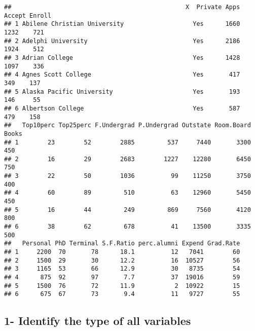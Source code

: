 \documentclass[]{article}
\newenvironment{Shaded}{\begin{snugshade}}{\end{snugshade}}
\newcommand{\DataTypeTok}[1]{\textcolor[rgb]{0.13,0.29,0.53}{#1}}
\newcommand{\KeywordTok}[1]{\textcolor[rgb]{0.13,0.29,0.53}{\textbf{#1}}}
\newcommand{\NormalTok}[1]{#1}
\newcommand{\OperatorTok}[1]{\textcolor[rgb]{0.81,0.36,0.00}{\textbf{#1}}}
\newcommand{\StringTok}[1]{\textcolor[rgb]{0.31,0.60,0.02}{#1}}
\begin{document}
\begin{verbatim}
##                                                X  Private Apps Accept Enroll
## 1 Abilene Christian University                   Yes      1660   1232    721
## 2 Adelphi University                             Yes      2186   1924    512
## 3 Adrian College                                 Yes      1428   1097    336
## 4 Agnes Scott College                            Yes       417    349    137
## 5 Alaska Pacific University                      Yes       193    146     55
## 6 Albertson College                              Yes       587    479    158
##   Top10perc Top25perc F.Undergrad P.Undergrad Outstate Room.Board Books
## 1        23        52        2885         537     7440       3300   450
## 2        16        29        2683        1227    12280       6450   750
## 3        22        50        1036          99    11250       3750   400
## 4        60        89         510          63    12960       5450   450
## 5        16        44         249         869     7560       4120   800
## 6        38        62         678          41    13500       3335   500
##   Personal PhD Terminal S.F.Ratio perc.alumni Expend Grad.Rate
## 1     2200  70       78      18.1          12   7041        60
## 2     1500  29       30      12.2          16  10527        56
## 3     1165  53       66      12.9          30   8735        54
## 4      875  92       97       7.7          37  19016        59
## 5     1500  76       72      11.9           2  10922        15
## 6      675  67       73       9.4          11   9727        55
\end{verbatim}

\hypertarget{identify-the-type-of-all-variables}{%
\subsection{1- Identify the type of all
variables}\label{identify-the-type-of-all-variables}}

\begin{Shaded}
\end{Shaded}
\end{document}
